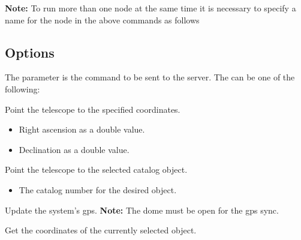 \documentclass[a4paper,english]{article}
\begin{document}
\textbf{Note:} To run more than one  node at the same time it is necessary to specify a name for the node in the above commands as follows 


\subsection{Options}

The  parameter is the command to be sent to the server. The  can be one of the following:

\begin{Description}\setlength{\itemsep}{0cm}
\item[\Arg{goto}] Point the telescope to the specified coordinates.

	     
	
	\begin{itemize}
		\item {} Right ascension as a double value.
		\item {} Declination as a double value.
	\end{itemize}
	
\item[\Arg{messier}] Point the telescope to the selected catalog object.

\item[\Arg{star}]	    
	
\item[\Arg{deepsky}]	    
	
	    
	
	\begin{itemize}
		\item {} The catalog number for the desired object.
	\end{itemize}
	
\item[\Arg{gps}] Update the system's gps. \textbf{Note:} The dome must be open for the gps sync.

	   
	
\item[\Arg{getobjradec}] Get the coordinates of the currently selected object.


\end{Description}
\end{document}
